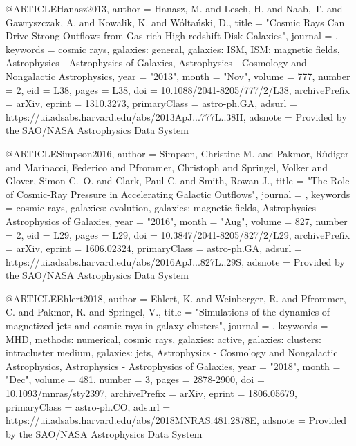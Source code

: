 \documentclass[useAMS,usenatbib]{mnras}
\begin{document}
{{{{{{@ARTICLE{Hanasz2013,
       author = {{Hanasz}, M. and {Lesch}, H. and {Naab}, T. and {Gawryszczak}, A. and
         {Kowalik}, K. and {W{\'o}lta{\'n}ski}, D.},
        title = "{Cosmic Rays Can Drive Strong Outflows from Gas-rich High-redshift Disk Galaxies}",
      journal = {\apjl},
     keywords = {cosmic rays, galaxies: general, galaxies: ISM, ISM: magnetic fields, Astrophysics - Astrophysics of Galaxies, Astrophysics - Cosmology and Nongalactic Astrophysics},
         year = "2013",
        month = "Nov",
       volume = {777},
       number = {2},
          eid = {L38},
        pages = {L38},
          doi = {10.1088/2041-8205/777/2/L38},
archivePrefix = {arXiv},
       eprint = {1310.3273},
 primaryClass = {astro-ph.GA},
       adsurl = {https://ui.adsabs.harvard.edu/abs/2013ApJ...777L..38H},
      adsnote = {Provided by the SAO/NASA Astrophysics Data System}
}

@ARTICLE{Simpson2016,
       author = {{Simpson}, Christine M. and {Pakmor}, R{\"u}diger and
         {Marinacci}, Federico and {Pfrommer}, Christoph and {Springel}, Volker and
         {Glover}, Simon C.~O. and {Clark}, Paul C. and {Smith}, Rowan J.},
        title = "{The Role of Cosmic-Ray Pressure in Accelerating Galactic Outflows}",
      journal = {\apjl},
     keywords = {cosmic rays, galaxies: evolution, galaxies: magnetic fields, Astrophysics - Astrophysics of Galaxies},
         year = "2016",
        month = "Aug",
       volume = {827},
       number = {2},
          eid = {L29},
        pages = {L29},
          doi = {10.3847/2041-8205/827/2/L29},
archivePrefix = {arXiv},
       eprint = {1606.02324},
 primaryClass = {astro-ph.GA},
       adsurl = {https://ui.adsabs.harvard.edu/abs/2016ApJ...827L..29S},
      adsnote = {Provided by the SAO/NASA Astrophysics Data System}
}

@ARTICLE{Ehlert2018,
       author = {{Ehlert}, K. and {Weinberger}, R. and {Pfrommer}, C. and {Pakmor}, R. and
         {Springel}, V.},
        title = "{Simulations of the dynamics of magnetized jets and cosmic rays in galaxy clusters}",
      journal = {\mnras},
     keywords = {MHD, methods: numerical, cosmic rays, galaxies: active, galaxies: clusters: intracluster medium, galaxies: jets, Astrophysics - Cosmology and Nongalactic Astrophysics, Astrophysics - Astrophysics of Galaxies},
         year = "2018",
        month = "Dec",
       volume = {481},
       number = {3},
        pages = {2878-2900},
          doi = {10.1093/mnras/sty2397},
archivePrefix = {arXiv},
       eprint = {1806.05679},
 primaryClass = {astro-ph.CO},
       adsurl = {https://ui.adsabs.harvard.edu/abs/2018MNRAS.481.2878E},
      adsnote = {Provided by the SAO/NASA Astrophysics Data System}
}

}}}}}}
\end{document}
